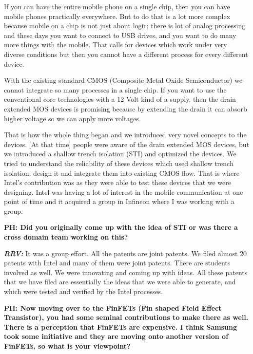 \begin{multicols}{2}
If you can have the entire mobile phone on a single chip, then you can have mobile phones practically everywhere. But to do that is a lot more complex because mobile on a chip is not just about logic; there is lot of analog processing and these days you want to connect to USB drives, and you want to do many more things with the mobile.  That calls for devices which work under very diverse conditions but then you cannot have a different process for every different device.

With the existing standard CMOS (Composite Metal  Oxide Semiconductor) we cannot integrate so many processes in a single chip. If you want to use the conventional core technologies with a 12 Volt kind of a supply, then the drain extended MOS devices is promising because by extending the drain it can absorb higher voltage so we can apply more voltages.

That is how the whole thing began and we introduced very novel concepts to the devices. [At that time] people were aware of the drain extended MOS devices, but we introduced a shallow trench isolation (STI) and optimized the devices. We tried to understand the reliability of these devices which used shallow trench isolation; design it and integrate them into existing CMOS flow. That is where Intel’s contribution was as they were able to test these devices that we were designing. Intel was having a lot of interest in the mobile communication at one point of time and it acquired a group in Infineon where I was working with a group.

\textbf{PH: Did you originally come up with the idea of STI or was there a cross domain team working on this?}

\textbf{\textit{RRV:}} It was a group effort. All the patents are joint patents. We filed almost 20 patents with Intel and many of them were joint patents. There are students involved as well. We were innovating and coming up with ideas. All these patents that we have filed are essentially the ideas that we were able to generate, and which were tested and verified by the Intel processes.

\textbf{PH: Now moving over to the FinFETs (Fin shaped Field Effect Transistor), you had some seminal contributions to make there as well. There is a perception that FinFETs are expensive. I think Samsung took some initiative and they are moving onto another version of FinFETs, so what is your viewpoint?}


\end{multicols}
